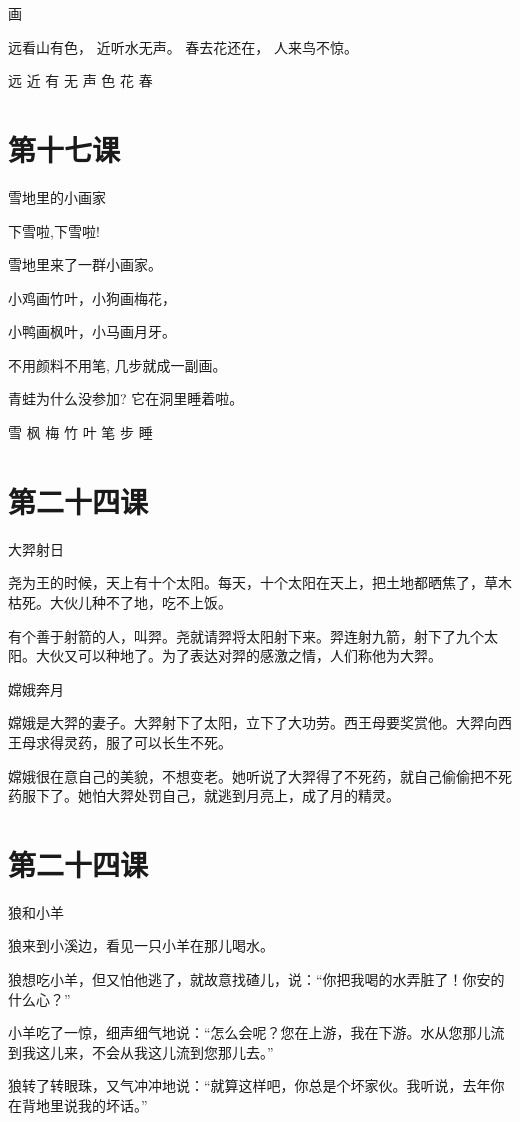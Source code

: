 \documentclass[12pt,UTF8]{ctexbook}
\begin{document}
画

远看山有色，
近听水无声。
春去花还在，
人来鸟不惊。

远 近 有 无 声 色 花 春

\section{第十七课}

雪地里的小画家

下雪啦,下雪啦!

雪地里来了一群小画家。

小鸡画竹叶，小狗画梅花，

小鸭画枫叶，小马画月牙。

不用颜料不用笔, 几步就成一副画。

青蛙为什么没参加? 它在洞里睡着啦。

雪 枫 梅 竹 叶 笔 步 睡

\section{第二十四课}

大羿射日

尧为王的时候，天上有十个太阳。每天，十个太阳在天上，把土地都晒焦了，草木枯死。大伙儿种不了地，吃不上饭。

有个善于射箭的人，叫羿。尧就请羿将太阳射下来。羿连射九箭，射下了九个太阳。大伙又可以种地了。为了表达对羿的感激之情，人们称他为大羿。

嫦娥奔月

嫦娥是大羿的妻子。大羿射下了太阳，立下了大功劳。西王母要奖赏他。大羿向西王母求得灵药，服了可以长生不死。

嫦娥很在意自己的美貌，不想变老。她听说了大羿得了不死药，就自己偷偷把不死药服下了。她怕大羿处罚自己，就逃到月亮上，成了月的精灵。

\section{第二十四课}

狼和小羊

狼来到小溪边，看见一只小羊在那儿喝水。

狼想吃小羊，但又怕他逃了，就故意找碴儿，说：“你把我喝的水弄脏了！你安的什么心？”

小羊吃了一惊，细声细气地说：“怎么会呢？您在上游，我在下游。水从您那儿流到我这儿来，不会从我这儿流到您那儿去。”

狼转了转眼珠，又气冲冲地说：“就算这样吧，你总是个坏家伙。我听说，去年你在背地里说我的坏话。”
\end{document}
